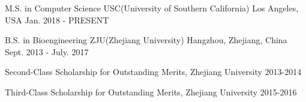 


\begin{cventries}

\cventry
{M.S. in Computer Science} %
{USC(University of Southern California)} %
{Los Angeles, USA} %
{Jan. 2018 - PRESENT} %
{
\begin{cvitems}
\end{cvitems}
}

\cventry
{B.S. in Bioengineering} %
{ZJU(Zhejiang University)} %
{Hangzhou, Zhejiang, China} %
{Sept. 2013 - July. 2017} %
{ %
\begin{cvitems}
\item {Second-Class Scholarship for Outstanding Merits, Zhejiang University    2013-2014}
\item {Third-Class Scholarship for Outstanding Merits, Zhejiang University    2015-2016}
\end{cvitems}
}

\end{cventries}